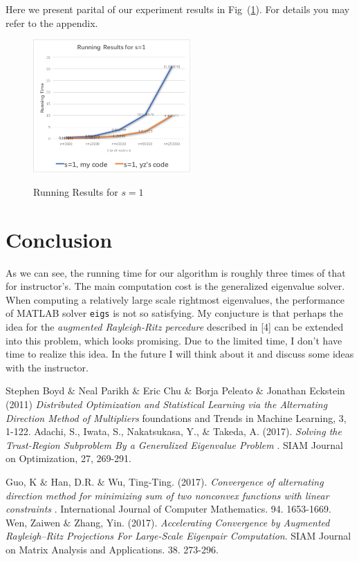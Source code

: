 Here we present parital of our experiment results in Fig~(\ref{fig:11}). For details you may refer to the appendix.
\begin{figure}
\centering\caption{Running Results for $s=1$}
\includegraphics[page=1,width=6cm]{P_4.pdf}
\label{fig:11}
\end{figure}

\section{Conclusion}
As we can see, the running time for our algorithm is roughly three times of that for instructor's. The main computation cost is the generalized eigenvalue solver. When computing a relatively large scale rightmost eigenvalues, the performance of MATLAB solver \texttt{eigs} is not so satisfying. My conjucture is that perhaps the idea for the \emph{augmented Rayleigh-Ritz percedure} described in [4] can be extended into this problem, which looks promising. Due to the limited time, I don't have time to realize this idea. In the future I will think about it and discuss some ideas with the instructor. 
\medskip
 
\begin{thebibliography}{9}
Stephen Boyd $\&$ Neal Parikh $\&$ Eric Chu $\&$ Borja Peleato $\&$ Jonathan Eckstein (2011)
\textit{
Distributed Optimization and Statistical Learning via the Alternating Direction Method of Multipliers
}
foundations and Trends in Machine Learning, 3,
1-122.
Adachi, S., Iwata, S., Nakatsukasa, Y., $\&$ Takeda, A. (2017). 
\textit{
Solving the Trust-Region Subproblem By a Generalized Eigenvalue Problem
}. SIAM Journal on Optimization, 27, 269-291.

Guo, K $\&$ Han, D.R. $\&$ Wu, Ting-Ting. (2017). 
\textit{
Convergence of alternating direction method for minimizing sum of two nonconvex functions with linear constraints
}. International Journal of Computer Mathematics. 94. 1653-1669.
Wen, Zaiwen $\&$ Zhang, Yin. (2017). 
\textit{
Accelerating Convergence by Augmented Rayleigh--Ritz Projections For Large-Scale Eigenpair Computation}. 
SIAM Journal on Matrix Analysis and Applications. 38. 273-296.
\end{thebibliography}













